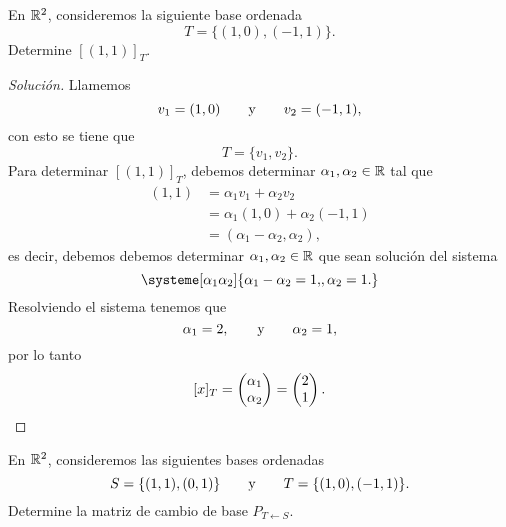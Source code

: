 \documentclass[a4,11pt]{aleph-notas}
\begin{document}
\encabezado

\begin{ejer}
    En $\mathbb{R}^2$, consideremos la siguiente base ordenada
    \[
        T = \{(1,0),(-1,1)\}.
    \]
    Determine $[(1,1)]_T$.
\end{ejer}


\begin{proof}[Solución]
    Llamemos
    \[
        v_1 = (1,0)\qquad\text{y}\qquad
        v_2 = (-1,1),
    \]
    con esto se tiene que
    \[
        T = \{v_1,v_2\}.
    \]
    Para determinar $[(1,1)]_T$, debemos determinar $\alpha_1,\alpha_2\in\mathbb{R}$ tal que 
    \begin{align*}
        (1,1) & = \alpha_1 v_1+\alpha_2 v_2 \\
        & = \alpha_1 (1,0)+\alpha_2(-1,1)\\
        & = (\alpha_1-\alpha_2,\alpha_2),
    \end{align*}
    es decir, debemos debemos determinar $\alpha_1,\alpha_2\in\mathbb{R}$ que sean solución del sistema
    \[
        \systeme[\alpha_1\alpha_2]{
        \alpha_1 - \alpha_2 = 1{,},
        \alpha_2 = 1{.}
        }
    \]
    Resolviendo el sistema tenemos que
    \[
        \alpha_1 = 2,\qquad\text{y}\qquad
        \alpha_2 = 1,
    \]
    por lo tanto
    \[
        [x]_T 
        = \begin{pmatrix} \alpha_1\\ \alpha_2 \end{pmatrix}
        = \begin{pmatrix} 2\\ 1  \end{pmatrix}.\qedhere
    \]
\end{proof}




\begin{ejer}
    En $\mathbb{R}^2$, consideremos las siguientes bases ordenadas
    \[
        S = \{(1,1),(0,1)\}
        \qquad\text{y}\qquad
        T = \{(1,0),(-1,1)\}.
    \]
    Determine la matriz de cambio de base $P_{T \leftarrow S}$.
\end{ejer}
\end{document}
